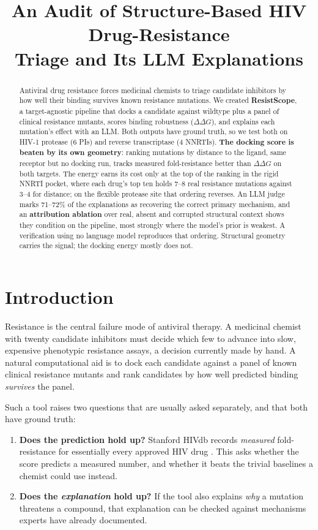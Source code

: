 \documentclass{article}
\title{An Audit of Structure-Based HIV Drug-Resistance
\\ Triage and Its LLM Explanations}
\newcommand{\ddg}{\ensuremath{\Delta\Delta G}}
\begin{document}
\maketitle

\begin{abstract}
Antiviral drug resistance forces medicinal chemists to triage candidate inhibitors by how well their binding survives known resistance mutations. We created \textbf{ResistScope}, a target-agnostic pipeline that docks a candidate against wildtype plus a panel of clinical resistance mutants, scores binding robustness (\ddg), and explains each mutation's effect with an LLM. Both outputs have ground truth, so we test both on HIV-1 protease (6 PIs) and reverse transcriptase (4 NNRTIs). \textbf{The docking score is beaten by its own geometry}: ranking mutations by distance to the ligand, same receptor but no docking run, tracks measured fold-resistance better than \ddg{} on both targets. The energy earns its cost only at the top of the ranking in the rigid NNRTI pocket, where each drug's top ten holds 7--8 real resistance mutations against 3--4 for distance; on the flexible protease site that ordering reverses. An LLM judge marks 71--72\% of the explanations as recovering the correct primary mechanism, and an \textbf{attribution ablation} over real, absent and corrupted structural context shows they condition on the pipeline, most strongly where the model's prior is weakest. A verification using no language model reproduces that ordering. Structural geometry carries the signal; the docking energy mostly does not.
\end{abstract}

\section{Introduction}
Resistance is the central failure mode of antiviral therapy. A medicinal chemist with twenty candidate inhibitors must decide which few to advance into slow, expensive phenotypic resistance assays, a decision currently made by hand. A natural computational aid is to dock each candidate against a panel of known clinical resistance mutants and rank candidates by how well predicted binding \emph{survives} the panel.

Such a tool raises two questions that are usually asked separately, and that both have ground truth:
\begin{enumerate}
\item \textbf{Does the prediction hold up?} Stanford HIVdb records \emph{measured} fold-resistance for essentially every approved HIV drug \citep{rhee2006}. This asks whether the score predicts a measured number, and whether it beats the trivial baselines a chemist could use instead.
\item \textbf{Does the \emph{explanation} hold up?} If the tool also explains \emph{why} a mutation threatens a compound, that explanation can be checked against mechanisms experts have already documented.
\end{enumerate}
\end{document}
